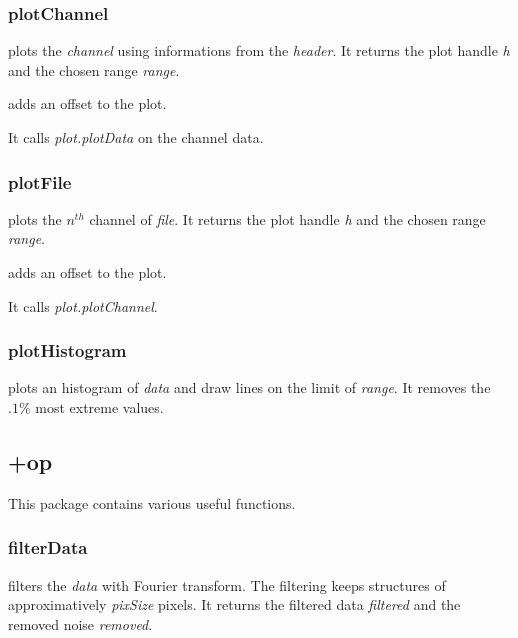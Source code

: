 \subsubsection{plotChannel}
\bdf
{} plots the \emph{channel} using informations from the \emph{header}. It returns the plot handle \emph{h} and the chosen range \emph{range}.

 adds an offset to the plot.
\edf

It calls \emph{plot.plotData} on the channel data.
\subsubsection{plotFile}

\bdf
{} plots the $n^{th}$ channel of \emph{file}. It returns the plot handle \emph{h} and the chosen range \emph{range}.

 adds an offset to the plot.
\edf

It calls \emph{plot.plotChannel}. 
\subsubsection{plotHistogram}
\bdf
{} plots an histogram of \emph{data} and draw lines on the limit of \emph{range}. It removes the $.1\%$ most extreme values. 
\edf

\subsection{+op}
This package contains various useful functions.
\subsubsection{filterData}
\bdf
{} filters the \emph{data} with Fourier transform. The filtering keeps structures of approximatively \emph{pixSize} pixels. It returns the filtered data \emph{filtered} and the removed noise \emph{removed}.

